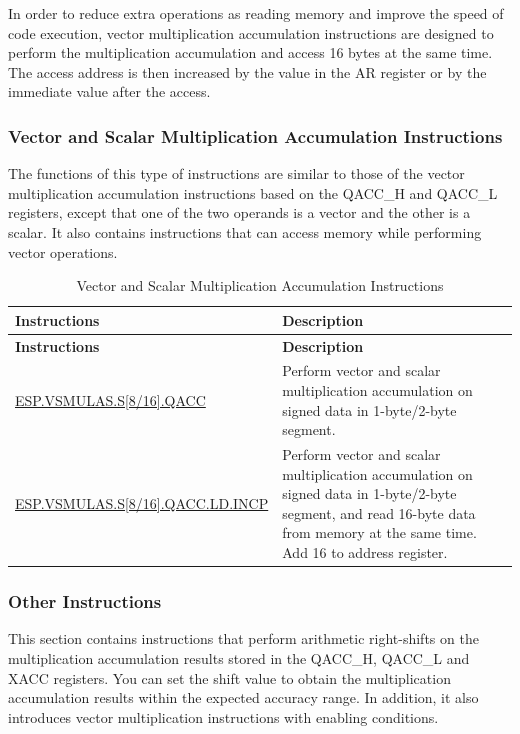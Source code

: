 \documentclass[main\_\_EN.tex]{subfiles}
\begin{document}
In order to reduce extra operations as reading memory and improve the speed of code execution, vector multiplication accumulation instructions are designed to perform the multiplication accumulation and access 16 bytes at the same time. The access address is then increased by the value in the AR register or by the immediate value after the access.




\subsubsection{Vector and Scalar Multiplication Accumulation Instructions}

The functions of this type of instructions are similar to those of the vector multiplication accumulation instructions based on the QACC\_H and QACC\_L registers, except that one of the two operands is a vector and the other is a scalar. It also contains instructions that can access memory while performing vector operations.

\begin{longtable}[c]{|l|m{10cm}|}
    \caption{Vector and Scalar Multiplication Accumulation Instructions}
    \label{tab:pie-vector-scalar-instructions}\\
    \hline
    \rowcolor{lightgray}
    \textbf{Instructions} & \textbf{Description} \\\hline
    \endfirsthead
    \rowcolor{lightgray}
    \textbf{Instructions} & \textbf{Description} \\\hline
    \endhead
    \endfoot

    \hyperref[instruction:ESPVSMULASS8QACC]{ESP.VSMULAS.S[8/16].QACC} & Perform vector and scalar multiplication accumulation on signed data in 1-byte/2-byte segment.
    \\\hline
    \hyperref[instruction:ESPVSMULASS8QACCLDINCP]{ESP.VSMULAS.S[8/16].QACC.LD.INCP} & Perform vector and scalar multiplication accumulation on signed data in 1-byte/2-byte segment, and read 16-byte data from memory at the same time. Add 16 to address register.
    \\\hline
\end{longtable}

\subsubsection{Other Instructions}

This section contains instructions that perform arithmetic right-shifts on the multiplication accumulation results stored in the QACC\_H, QACC\_L and XACC registers. You can set the shift value to obtain the multiplication accumulation results within the expected accuracy range. In addition, it also introduces vector multiplication instructions with enabling conditions.
\end{document}
